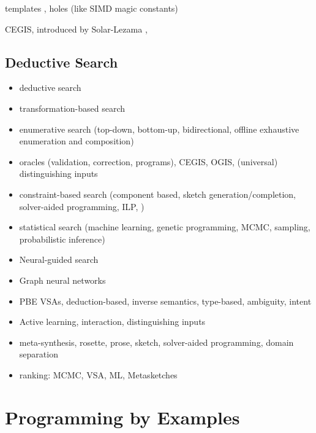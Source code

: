 templates \cite{Srivastava:2012},
holes (like SIMD magic constants) \cite{Solar-Lezama:2008}

\ac{CEGIS}, introduced by Solar-Lezama \cite{Solar-Lezama:2008},

\subsection{Deductive Search}
\label{sec:deductive-search}


\begin{itemize}
\item deductive search
\item transformation-based search
\item enumerative search (top-down, bottom-up, bidirectional, offline exhaustive enumeration and composition)
\item oracles (validation, correction, programs), CEGIS, OGIS, (universal) distinguishing inputs
\item constraint-based search (component based, sketch generation/completion, solver-aided programming, ILP, )
\item statistical search (machine learning, genetic programming, MCMC, sampling, probabilistic inference)
\item Neural-guided search
\item Graph neural networks
\item PBE VSAs, deduction-based, inverse semantics, type-based, ambiguity, intent
\item Active learning, interaction, distinguishing inputs
\item meta-synthesis, rosette, prose, sketch, solver-aided programming, domain separation
\item ranking: MCMC, VSA, ML, Metasketches
\end{itemize}

\section{Programming by Examples}
\label{sec:pbe}

